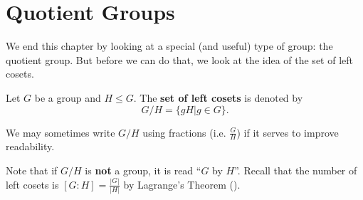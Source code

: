 \section{Quotient Groups}
We end this chapter by looking at a special (and useful) type of group: the quotient group. But before we can do that, we look at the idea of the set of left cosets.

\begin{definition}
    Let $G$ be a group and $H \leq G$. The \textbf{set of left cosets} is denoted by
    \[
        G/H = \{gH \vert g \in G \}.
    \]
\end{definition}
\begin{remark}
    We may sometimes write $G/H$ using fractions (i.e. $\frac GH$) if it serves to improve readability.
\end{remark}

Note that if $G/H$ is \textbf{not} a group, it is read ``$G$ by $H$''. Recall that the number of left cosets is $[G:H] = \frac{|G|}{|H|}$ by Lagrange's Theorem ().

